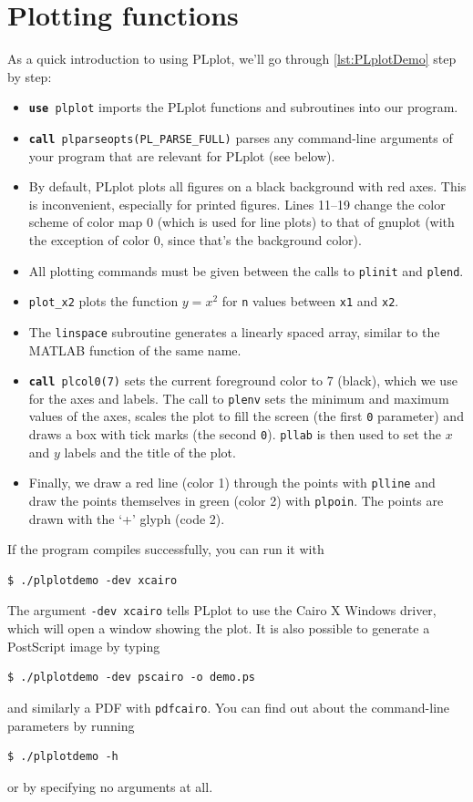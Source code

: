 \documentclass[openany,oneside]{report}
\newcommand{\keyword}[1]{\texttt{\bfseries\color{DarkRed}#1}}
\begin{document}
\section{Plotting functions}

As a quick introduction to using PLplot, we'll go through \autoref{lst:PLplotDemo} step by step:

%
\begin{itemize}
  \item \texttt{\keyword{use} plplot} imports the PLplot functions and subroutines into our program.
  \item \texttt{\keyword{call} plparseopts(PL\_PARSE\_FULL)} parses any command-line arguments of your program that are relevant for PLplot (see below).
  \item By default, PLplot plots all figures on a black background with red axes.
    This is inconvenient, especially for printed figures.
    Lines 11--19 change the color scheme of color map 0 (which is used for line plots) to that of gnuplot (with the exception of color 0, since that's the background color).
  \item All plotting commands must be given between the calls to \texttt{plinit} and \texttt{plend}.
  \item \texttt{plot\_x2} plots the function $y=x^2$ for \texttt{n} values between \texttt{x1} and \texttt{x2}.
  \item The \texttt{linspace} subroutine generates a linearly spaced array, similar to the MATLAB function of the same name.
  \item \texttt{\keyword{call} plcol0(7)} sets the current foreground color to 7 (black), which we use for the axes and labels.
    The call to \texttt{plenv} sets the minimum and maximum values of the axes, scales the plot to fill the screen (the first \texttt{0} parameter) and draws a box with tick marks (the second \texttt{0}).
    \texttt{pllab} is then used to set the $x$ and $y$ labels and the title of the plot.
  \item Finally, we draw a red line (color 1) through the points with \texttt{plline} and draw the points themselves in green (color 2) with \texttt{plpoin}.
    The points are drawn with the `+' glyph (code 2).
\end{itemize}
If the program compiles successfully, you can run it with
\begin{verbatim}
$ ./plplotdemo -dev xcairo
\end{verbatim}
The argument \texttt{-dev xcairo} tells PLplot to use the Cairo X Windows driver, which will open a window showing the plot.
It is also possible to generate a PostScript image by typing
\begin{verbatim}
$ ./plplotdemo -dev pscairo -o demo.ps
\end{verbatim}
and similarly a PDF with \texttt{pdfcairo}. You can find out about the command-line parameters by running
\begin{verbatim}
$ ./plplotdemo -h
\end{verbatim}
or by specifying no arguments at all.
\end{document}
